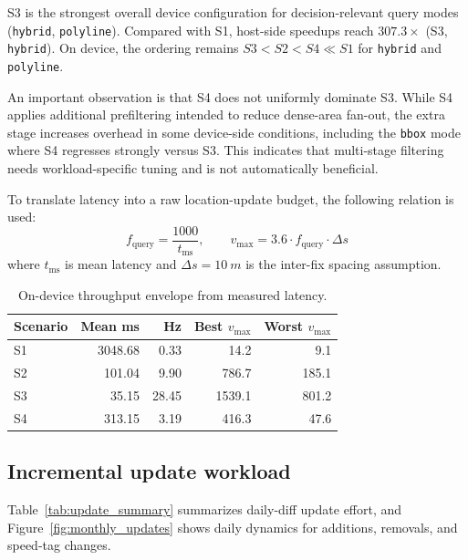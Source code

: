 \documentclass[conference]{IEEEtran}
\begin{document}
S3 is the strongest overall device configuration for decision-relevant query modes (\texttt{hybrid}, \texttt{polyline}). Compared with S1, host-side speedups reach \(307.3\times\) (S3, \texttt{hybrid}). On device, the ordering remains \(S3 < S2 < S4 \ll S1\) for \texttt{hybrid} and \texttt{polyline}.

An important observation is that S4 does not uniformly dominate S3. While S4 applies additional prefiltering intended to reduce dense-area fan-out, the extra stage increases overhead in some device-side conditions, including the \texttt{bbox} mode where S4 regresses strongly versus S3. This indicates that multi-stage filtering needs workload-specific tuning and is not automatically beneficial.

To translate latency into a raw location-update budget, the following relation is used:
\begin{equation}
f_{\text{query}}=\frac{1000}{t_{\text{ms}}}, \qquad
v_{\max}=3.6\cdot f_{\text{query}} \cdot \Delta s
\label{eq:speed}
\end{equation}
where \(t_{\text{ms}}\) is mean latency and \(\Delta s=\SI{10}{m}\) is the inter-fix spacing assumption.

\begin{table}[!t]
\caption{On-device throughput envelope from measured latency.}
\label{tab:device_speed_envelope}
\centering
\begin{tabular}{lrrrr}
\toprule
Scenario & Mean ms & Hz & Best \(v_{\max}\) & Worst \(v_{\max}\) \\
\midrule
S1 & 3048.68 & 0.33 & 14.2 & 9.1 \\
S2 & 101.04 & 9.90 & 786.7 & 185.1 \\
S3 & 35.15 & 28.45 & 1539.1 & 801.2 \\
S4 & 313.15 & 3.19 & 416.3 & 47.6 \\
\bottomrule
\end{tabular}
\end{table}

\subsection{Incremental update workload}
Table~\ref{tab:update_summary} summarizes daily-diff update effort, and Figure~\ref{fig:monthly_updates} shows daily dynamics for additions, removals, and speed-tag changes.
\end{document}
